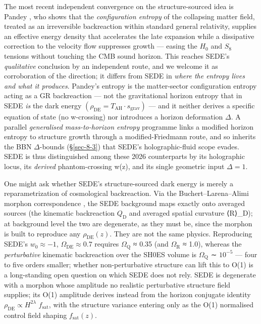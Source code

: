 \documentclass[preprint,12pt]{elsarticle}
\begin{document}
The most recent independent convergence on the structure-sourced idea is
Pandey \citep{Pandey:2026}, who shows that the \emph{configuration
entropy} of the collapsing matter field, treated as an irreversible
backreaction within standard general relativity, supplies an effective
energy density that accelerates the late expansion while a dissipative
correction to the velocity flow suppresses growth --- easing the
\(H_{0}\) and \(S_{8}\) tensions without touching the CMB sound horizon.
This reaches SEDE's \emph{qualitative} conclusion by an independent
route, and we welcome it as corroboration of the direction; it differs
from SEDE in \emph{where the entropy lives and what it produces}.
Pandey's entropy is the matter-sector configuration entropy acting as a
GR backreaction --- not the gravitational horizon entropy that in SEDE
\emph{is} the dark energy
\((\rho _\mathrm{DE} = T_\mathrm{AH}\cdot s_{\mathrm{grav}})\) --- and
it neither derives a specific equation of state (no w-crossing) nor
introduces a horizon deformation \(\Delta\). A parallel
\emph{generalised mass-to-horizon entropy} programme
\citep{Shameeem:2026, Mondal:2026} links a modified horizon entropy to
structure growth through a modified-Friedmann route, and so inherits the
BBN \(\Delta\)-bounds (§\ref{sec-8-3}) that SEDE's holographic-fluid
scope evades. SEDE is thus distinguished among these 2026 counterparts
by its holographic locus, its \emph{derived} phantom-crossing w(z), and
its single geometric input \(\Delta  = 1\).

One might ask whether SEDE's structure-sourced dark energy is merely a
reparametrization of cosmological backreaction. Via the
Buchert--Larena--Alimi morphon correspondence \citep{Buchert:2006ya},
the SEDE background maps exactly onto averaged sources (the kinematic
backreaction \(Q_{\mathrm{D}}\) and averaged spatial curvature ⟨R⟩\_D);
at background level the two are degenerate, as they must be, since the
morphon is built to reproduce any \(\rho _\mathrm{DE}(z)\). They are not
the same physics. Reproducing SEDE's \(w_{0} \approx  -1\),
\(\Omega _\mathrm{DE} \approx  0.7\) requires
\textbar{}\(\Omega _{\mathrm{Q}}\)\textbar{} ≈ 0.35 (and
\textbar{}\(\Omega _{\mathrm{R}}\)\textbar{} ≈ 1.0), whereas the
\emph{perturbative} kinematic backreaction over the SH0ES volume is
\(\Omega _{\mathrm{Q}}\) ∼ \(10^{-5}\) --- four to five orders smaller;
whether non-perturbative structure can lift this to O(1) is a
long-standing open question \citep{Buchert:2007ik, Wiltshire:2007fg} on
which SEDE does not rely. SEDE is degenerate with a morphon whose
amplitude no realistic perturbative structure field supplies; its O(1)
amplitude derives instead from the horizon conjugate identity
\(\rho _\mathrm{DE} \propto  H^{2\lambda }\) \(f_{\mathrm{sat}}\), with
the structure variance entering only as the O(1) normalised control
field shaping \(f_{\mathrm{sat}}(z)\).
\end{document}
